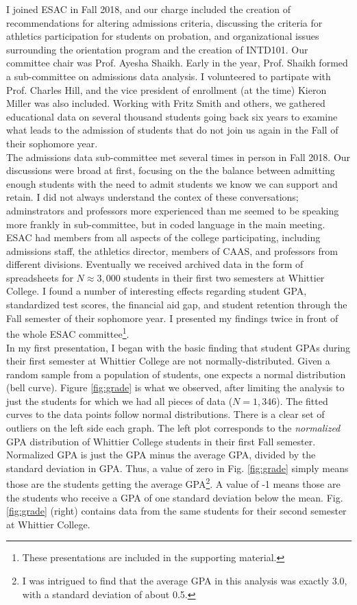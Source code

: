 \documentclass[../../../main.tex]{subfiles}
\begin{document}
I joined ESAC in Fall 2018, and our charge included the creation of recommendations for altering admissions criteria, discussing the criteria for athletics participation for students on probation, and organizational issues surrounding the orientation program and the creation of INTD101.  Our committee chair was Prof. Ayesha Shaikh.  Early in the year, Prof. Shaikh formed a sub-committee on admissions data analysis.  I volunteered to partipate with Prof. Charles Hill, and the vice president of enrollment (at the time) Kieron Miller was also included.  Working with Fritz Smith and others, we gathered educational data on several thousand students going back six years to examine what leads to the admission of students that do not join us again in the Fall of their sophomore year.
\\
\vspace{0.25cm}
The admissions data sub-committee met several times in person in Fall 2018.  Our discussions were broad at first, focusing on the the balance between admitting enough students with the need to admit students we know we can support and retain.  I did not always understand the contex of these conversations; adminstrators and professors more experienced than me seemed to be speaking more frankly in sub-committee, but in coded language in the main meeting.  ESAC had members from all aspects of the college participating, including admissions staff, the athletics director, members of CAAS, and professors from different divisions.  Eventually we received archived data in the form of spreadsheets for $N \approx 3,000$ students in their first two semesters at Whittier College.  I found a number of interesting effects regarding student GPA, standardized test scores, the financial aid gap, and student retention through the Fall semester of their sophomore year.  I presented my findings twice in front of the whole ESAC committee\footnote{These presentations are included in the supporting material.}.
\\
\vspace{0.25cm}
In my first presentation, I began with the basic finding that student GPAs during their first semester at Whittier College are not normally-distributed.  Given a random sample from a population of students, one expects a normal distribution (bell curve).  Figure \ref{fig:grade} is what we observed, after limiting the analysis to just the students for which we had all pieces of data ($N = 1,346$).  The fitted curves to the data points follow normal distributions.  There is a clear set of outliers on the left side each graph.  The left plot corresponds to the \textit{normalized} GPA distribution of Whittier College students in their first Fall semester.  Normalized GPA is just the GPA minus the average GPA, divided by the standard deviation in GPA.  Thus, a value of zero in Fig. \ref{fig:grade} simply means those are the students getting the average GPA\footnote{I was intrigued to find that the average GPA in this analysis was exactly 3.0, with a standard deviation of about 0.5.}.  A value of -1 means those are the students who receive a GPA of one standard deviation below the mean.  Fig. \ref{fig:grade} (right) contains data from the same students for their second semester at Whittier College.
\end{document}
